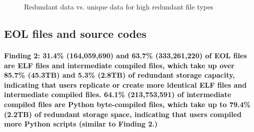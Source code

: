 \begin{figure}
	\centering
	\caption{Redundant data vs. unique data for high redundant file types}
	\label{fig:file-types}
\end{figure}

\subsection{EOL files and source codes}

\paragraph{Finding 2: 31.4\% (164,059,690) and 63.7\% (333,261,220) of EOL files are ELF files and intermediate compiled files, which take up over 85.7\% (45.3TB) and 5.3\% (2.8TB) of redundant storage capacity, indicating that users replicate or create more identical ELF files and intermediate compiled files. 64.1\% (213,753,591) of intermediate compiled files are Python byte-compiled files, which take up to 79.4\% (2.2TB) of redundant storage space, indicating that users compiled more Python scripts (similar to Finding 2.)}

